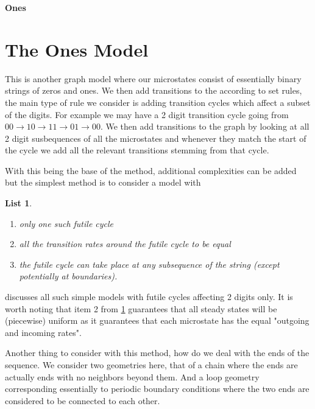 \documentclass[11pt]{article}
\theoremstyle{nothm}
\newtheorem{nlist}{List}
\begin{document}
\begin{center}
    \LARGE
    \textbf{Ones}
    \vspace{1em}
\end{center}

\section{The Ones Model}
This is another graph model where our microstates consist of essentially binary strings of zeros and ones.
We then add transitions to the according to set rules, the main type of rule we consider is adding transition cycles which affect a subset of the digits.
For example we may have a 2 digit transition cycle going from $00\rightarrow10\rightarrow11\rightarrow01\rightarrow00$.
We then add transitions to the graph by looking at all 2 digit susbequences of all the microstates and whenever they match the start of the cycle we add all the relevant transitions stemming from that cycle.

With this being the base of the method, additional complexities can be added but the simplest method is to consider a model with
\begin{nlist}\label{nlist:simplest}\leavevmode
    \begin{enumerate}
        \item only one such futile cycle
        \item all the transition rates around the futile cycle to be equal
        \item the futile cycle can take place at any subsequence of the string (except potentially at boundaries).
    \end{enumerate}
\end{nlist}
 discusses all such simple models with futile cycles affecting 2 digits only.
It is worth noting that item 2 from \cref{nlist:simplest} guarantees that all steady states will be (piecewise) uniform as it guarantees that each microstate has the equal "outgoing and incoming rates".

Another thing to consider with this method, how do we deal with the ends of the sequence.
We consider two geometries here, that of a chain where the ends are actually ends with no neighbors beyond them.
And a loop geometry corresponding essentially to periodic boundary conditions where the two ends are considered to be connected to each other.
\end{document}
